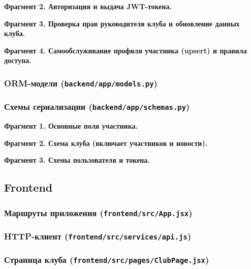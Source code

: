 \documentclass[utf8, russian]{eskdtext}
\begin{document}
\textbf{Фрагмент 2. Авторизация и выдача JWT-токена.}


\textbf{Фрагмент 3. Проверка прав руководителя клуба и обновление данных клуба.}


\textbf{Фрагмент 4. Самообслуживание профиля участника (upsert) и правила доступа.}


\subsubsection*{ORM-модели (\texttt{backend/app/models.py})}


\subsubsection*{Схемы сериализации (\texttt{backend/app/schemas.py})}
\textbf{Фрагмент 1. Основные поля участника.}


\textbf{Фрагмент 2. Схема клуба (включает участников и новости).}


\textbf{Фрагмент 3. Схемы пользователя и токена.}


\newpage
\subsection*{Frontend}

\subsubsection*{Маршруты приложения (\texttt{frontend/src/App.jsx})}


\subsubsection*{HTTP-клиент (\texttt{frontend/src/services/api.js})}


\subsubsection*{Страница клуба (\texttt{frontend/src/pages/ClubPage.jsx})}

\end{document}
